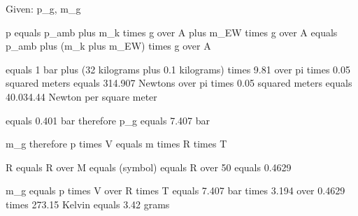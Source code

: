 Given: p_g, m_g  

p equals p_amb plus m_k times g over A plus m_EW times g over A equals p_amb plus (m_k plus m_EW) times g over A  

equals 1 bar plus (32 kilograms plus 0.1 kilograms) times 9.81 over pi times 0.05 squared meters equals 314.907 Newtons over pi times 0.05 squared meters equals 40.034.44 Newton per square meter  

equals 0.401 bar therefore p_g equals 7.407 bar  

m_g therefore p times V equals m times R times T  

R equals R over M equals (symbol) equals R over 50 equals 0.4629  

m_g equals p times V over R times T equals 7.407 bar times 3.194 over 0.4629 times 273.15 Kelvin equals 3.42 grams